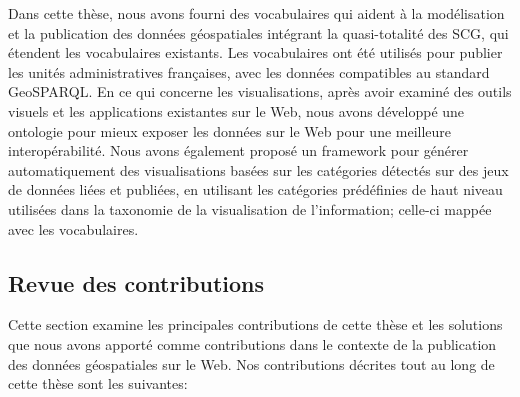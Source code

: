 \documentclass[a4paper,11pt,twoside]{report}
\begin{document}
Dans cette thèse, nous avons fourni des vocabulaires qui aident à la modélisation et la publication des données géospatiales intégrant la quasi-totalité des SCG, qui étendent les vocabulaires existants. Les vocabulaires ont été utilisés pour publier les unités administratives françaises, avec les données compatibles au standard GeoSPARQL. En ce qui concerne les visualisations, après avoir examiné des outils visuels et les applications existantes sur le Web, nous avons développé une ontologie pour mieux exposer les données sur le Web pour une meilleure interopérabilité. Nous avons également proposé un framework pour générer automatiquement des visualisations basées sur les catégories détectés sur des jeux de données liées et publiées, en utilisant les catégories prédéfinies de haut niveau  utilisées dans la taxonomie de la visualisation de l'information; celle-ci mappée avec les vocabulaires.





\subsection*{Revue des contributions}

Cette section examine les principales contributions de cette thèse et les solutions que nous avons apporté comme contributions dans le contexte de la publication des données géospatiales sur le Web. Nos contributions décrites tout au long de cette thèse sont les suivantes:
\end{document}
